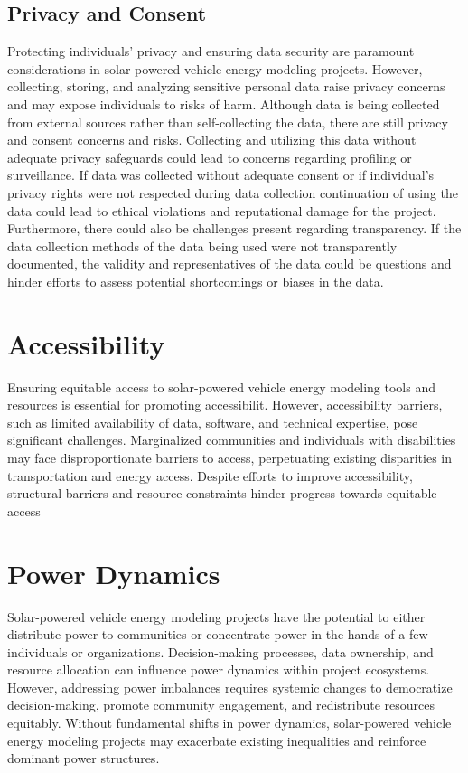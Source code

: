 \documentclass[10pt,twocolumn]{article}
\begin{document}
\subsection{Privacy and Consent}
Protecting individuals' privacy and ensuring data security are paramount considerations in solar-powered vehicle energy modeling projects. However, collecting, storing, and analyzing sensitive personal data raise privacy concerns and may expose individuals to risks of harm. Although data is being collected from external sources rather than self-collecting the data, there are still privacy and consent concerns and risks. Collecting and utilizing this data without adequate privacy safeguards could lead to concerns regarding profiling or surveillance. If data was collected without adequate consent or if individual's privacy rights were not respected during data collection continuation of using the data could lead to ethical violations and reputational damage for the project. Furthermore, there could also be challenges present regarding transparency. If the data collection methods of the data being used were not transparently documented, the validity and representatives of the data could be questions and hinder efforts to assess potential shortcomings or biases in the data. 

\section{Accessibility}
Ensuring equitable access to solar-powered vehicle energy modeling tools and resources is essential for promoting accessibilit. However, accessibility barriers, such as limited availability of data, software, and technical expertise, pose significant challenges. Marginalized communities and individuals with disabilities may face disproportionate barriers to access, perpetuating existing disparities in transportation and energy access. Despite efforts to improve accessibility, structural barriers and resource constraints hinder progress towards equitable access
\section{Power Dynamics}
Solar-powered vehicle energy modeling projects have the potential to either distribute power to communities or concentrate power in the hands of a few individuals or organizations. Decision-making processes, data ownership, and resource allocation can influence power dynamics within project ecosystems. However, addressing power imbalances requires systemic changes to democratize decision-making, promote community engagement, and redistribute resources equitably. Without fundamental shifts in power dynamics, solar-powered vehicle energy modeling projects may exacerbate existing inequalities and reinforce dominant power structures.
\end{document}
